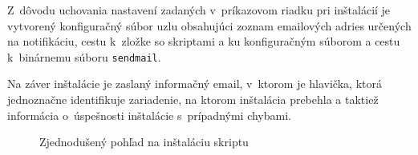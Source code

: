 Z~dôvodu uchovania nastavení zadaných v~príkazovom riadku pri inštalácií je vytvorený konfiguračný súbor uzlu obsahujúci zoznam emailových adries určených na notifikáciu, cestu k~zložke so skriptami a ku konfiguračným súborom a cestu k~binárnemu súboru \texttt{sendmail}.

Na záver inštalácie je zaslaný informačný email, v~ktorom je hlavička, ktorá jednoznačne identifikuje zariadenie, na ktorom inštalácia prebehla a taktiež informácia o~úspešnosti inštalácie s~prípadnými chybami.

\begin{figure}[H]
	\begin{center}
		\vspace{-2.5em}
		\caption{Zjednodušený pohľad na inštaláciu skriptu}
		\label{script_install_pic}
	\end{center}
\end{figure}
